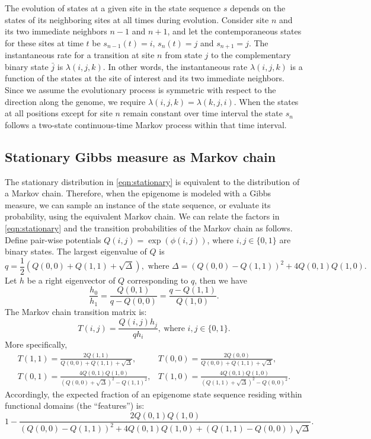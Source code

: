 \documentclass[11pt]{article}
\begin{document}
The evolution of states at a given site in the state sequence $s$
depends on the states of its neighboring sites at all times during
evolution. Consider site $n$ and its two immediate neighbors $n-1$ and
$n+1$, and let the contemporaneous states for these sites at time $t$
be $s_{n-1}(t) = i$, $s_n(t)=j$ and $s_{n+1}=j$. The instantaneous
rate for a transition at site $n$ from state $j$ to the complementary
binary state $\bar{j}$ is $\lambda(i, j, k)$. In other words, the
instantaneous rate $\lambda(i, j, k)$ is a function of the states at
the site of interest and its two immediate neighbors.  Since we assume
the evolutionary process is symmetric with respect to the direction
along the genome, we require $\lambda(i, j, k) = \lambda(k, j, i)$.
When the states at all positions except for site $n$ remain constant
over time interval the state $s_n$ follows a two-state continuous-time
Markov process within that time interval.

\subsection{Stationary Gibbs measure as Markov chain}

The stationary distribution in \eqref{eqn:stationary} is equivalent to
the distribution of a Markov chain. Therefore, when the epigenome is
modeled with a Gibbs measure, we can sample an instance of the state
sequence, or evaluate its probability, using the equivalent Markov
chain. We can relate the factors in \eqref{eqn:stationary} and the
transition probabilities of the Markov chain as follows. Define
pair-wise potentials $Q(i,j)=\exp(\phi(i, j))$, where $i, j\in\{0,1\}$
are binary states. The largest eigenvalue of $Q$ is
\[
q=\textstyle\frac{1}{2}\left(Q(0,0)+Q(1,1) +\sqrt{\Delta}\right), \text{ where }
\Delta=(Q(0,0) - Q(1,1))^2 + 4Q(0,1)Q(1,0).
\]
Let $h$ be a right eigenvector of $Q$ corresponding to $q$, then we have
\[
\frac{h_0}{h_1} = \frac{Q(0,1)}{q-Q(0,0)} = \frac{q-Q(1,1)}{Q(1,0)}.
\]
The Markov chain transition matrix is:
\[
T(i,j) = \frac{Q(i,j)h_j}{qh_{i}},~\text{where } i,j \in\{0,1\}.
\]
More specifically,
\begin{equation} \label{eqn:gibbs2markov}
  \begin{array}{ll}
    T(1,1) = \displaystyle\frac{2Q(1,1)}{Q(0,0)+Q(1,1)+\sqrt{\Delta}}, &
    T(0,0) = \displaystyle\frac{2Q(0,0)}{Q(0,0)+Q(1,1)+\sqrt{\Delta}}, \\[2em]
    T(0,1) = \displaystyle\frac{4Q(0,1)Q(1,0)}{(Q(0,0)+\sqrt{\Delta})^2 -Q(1,1)^2}, &
    T(1,0) = \displaystyle\frac{4Q(0,1)Q(1,0)}{(Q(1,1)+\sqrt{\Delta})^2 -Q(0,0)^2}.
  \end{array}
\end{equation}
Accordingly, the expected fraction of an epigenome state sequence
residing within functional domains (the ``features'') is:
\[
1- \frac{2Q(0,1)Q(1,0)}{(Q(0,0)-Q(1,1))^2 + 4Q(0,1)Q(1,0) +
  (Q(1,1)-Q(0,0))\sqrt{\Delta}}.
\]
\end{document}
